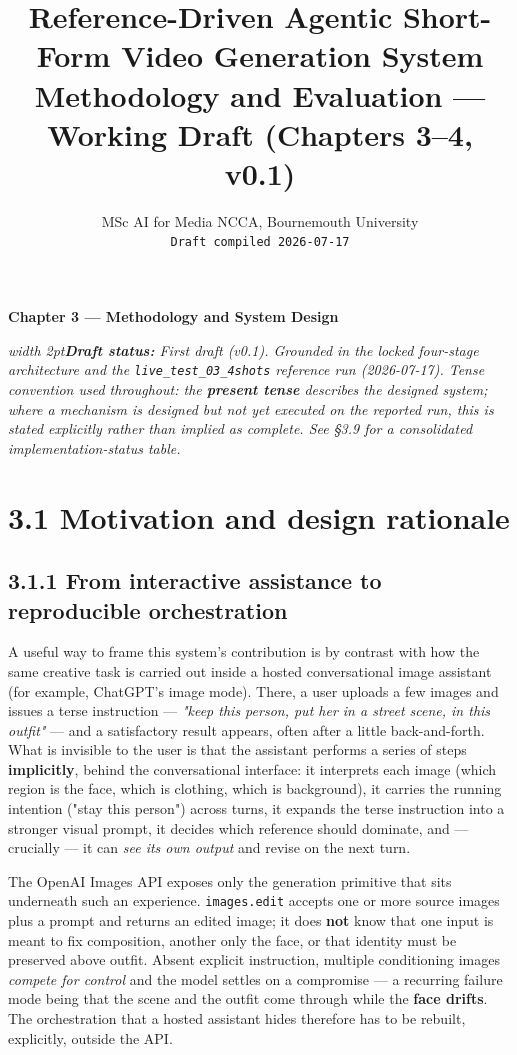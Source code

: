 \documentclass[10pt,twocolumn,letterpaper]{article}
\title{\vspace{-1.2em}\textbf{Reference-Driven Agentic Short-Form Video Generation System}\\[2pt]
\large Methodology and Evaluation --- Working Draft (Chapters 3--4, v0.1)}
\author{MSc AI for Media \quad\textbullet\quad NCCA, Bournemouth University\\
\texttt{Draft compiled 2026-07-17}}
\date{}
\newenvironment{quotebox}%
 {\par\vspace{3pt}\noindent\begin{list}{}{\setlength{\leftmargin}{1em}\setlength{\rightmargin}{0.5em}}\item\footnotesize\itshape\color{black!80}\hspace*{-0.6em}\vrule width 2pt\hspace{0.6em}\ignorespaces}%
 {\end{list}\vspace{3pt}}
\begin{document}
\maketitle
{\centering\large\bfseries Chapter 3 --- Methodology and System Design\par}\vspace{4pt}

\begin{quotebox}\textbf{Draft status:} First draft (v0.1). Grounded in the locked four-stage architecture and the \texttt{live\_test\_03\_4shots} reference run (2026-07-17). Tense convention used throughout: the \textbf{present tense} describes the \emph{designed} system; where a mechanism is designed but not yet executed on the reported run, this is stated explicitly rather than implied as complete. See \S{}3.9 for a consolidated implementation-status table.\end{quotebox}

\section*{3.1 Motivation and design rationale}

\subsection*{3.1.1 From interactive assistance to reproducible orchestration}

A useful way to frame this system's contribution is by contrast with how the same creative task is carried out inside a hosted conversational image assistant (for example, ChatGPT's image mode). There, a user uploads a few images and issues a terse instruction --- \emph{"keep this person, put her in a street scene, in this outfit"} --- and a satisfactory result appears, often after a little back-and-forth. What is invisible to the user is that the assistant performs a series of steps \textbf{implicitly}, behind the conversational interface: it interprets each image (which region is the face, which is clothing, which is background), it carries the running intention ("stay this person") across turns, it expands the terse instruction into a stronger visual prompt, it decides which reference should dominate, and --- crucially --- it can \emph{see its own output} and revise on the next turn.

The OpenAI Images API exposes only the generation primitive that sits underneath such an experience. \texttt{images.edit} accepts one or more source images plus a prompt and returns an edited image; it does \textbf{not} know that one input is meant to fix composition, another only the face, or that identity must be preserved above outfit. Absent explicit instruction, multiple conditioning images \emph{compete for control} and the model settles on a compromise --- a recurring failure mode being that the scene and the outfit come through while the \textbf{face drifts}. The orchestration that a hosted assistant hides therefore has to be rebuilt, explicitly, outside the API.
\end{document}
